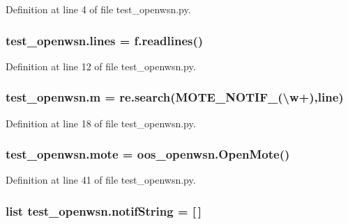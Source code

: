 Definition at line 4 of file test\+\_\+openwsn.\+py.

\subsubsection[{\texorpdfstring{lines}{lines}}]{\setlength{\rightskip}{0pt plus 5cm}test\+\_\+openwsn.\+lines = f.\+readlines()}\hypertarget{namespacetest__openwsn_ad8c8bd6c5d990378eddab44bd10fadb5}{}\label{namespacetest__openwsn_ad8c8bd6c5d990378eddab44bd10fadb5}


Definition at line 12 of file test\+\_\+openwsn.\+py.

\subsubsection[{\texorpdfstring{m}{m}}]{\setlength{\rightskip}{0pt plus 5cm}test\+\_\+openwsn.\+m = re.\+search(\textquotesingle{}M\+O\+T\+E\+\_\+\+N\+O\+T\+I\+F\+\_\+(\textbackslash{}w+)\textquotesingle{},{\bf line})}\hypertarget{namespacetest__openwsn_a42e7b74b0935e2b177bcafbb70953694}{}\label{namespacetest__openwsn_a42e7b74b0935e2b177bcafbb70953694}


Definition at line 18 of file test\+\_\+openwsn.\+py.

\subsubsection[{\texorpdfstring{mote}{mote}}]{\setlength{\rightskip}{0pt plus 5cm}test\+\_\+openwsn.\+mote = {\bf oos\+\_\+openwsn.\+Open\+Mote}()}\hypertarget{namespacetest__openwsn_a6c13977c553268fe64fbcaa394bf20e3}{}\label{namespacetest__openwsn_a6c13977c553268fe64fbcaa394bf20e3}


Definition at line 41 of file test\+\_\+openwsn.\+py.

\subsubsection[{\texorpdfstring{notif\+String}{notifString}}]{\setlength{\rightskip}{0pt plus 5cm}list test\+\_\+openwsn.\+notif\+String = \mbox{[}$\,$\mbox{]}}\hypertarget{namespacetest__openwsn_ae328fb1c7b53ef9b3cf133b925b839e7}{}\label{namespacetest__openwsn_ae328fb1c7b53ef9b3cf133b925b839e7}



